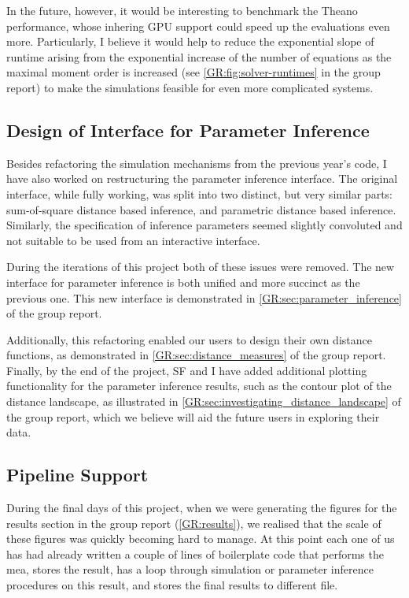 In the future, however, it would be interesting to benchmark the Theano performance, whose inhering GPU support could speed up the evaluations even more.
Particularly, I believe it would help to reduce the exponential slope of runtime arising from the exponential increase of the number of equations as the maximal moment order is increased (see \autoref{GR:fig:solver-runtimes} in the group report) to make the simulations feasible for even more complicated systems.

\subsection{Design of Interface for Parameter Inference}

Besides refactoring the simulation mechanisms from the previous year's code, I have also worked on restructuring the parameter inference interface. 
The original interface, while fully working, was split into two distinct, but very similar parts: sum-of-square distance based inference, and parametric distance based inference. Similarly, the specification of inference parameters seemed slightly convoluted and not suitable to be used from an interactive interface. 

During the iterations of this project both of these issues were removed. The new interface for parameter inference is
both unified and more succinct as the previous one. This new interface is demonstrated in \autoref*{GR:sec:parameter_inference} of the group report.

Additionally, this refactoring enabled our users to design their own distance functions, as demonstrated in \autoref*{GR:sec:distance_measures} of the group report.
Finally, by the end of the project, SF and I have added additional plotting functionality for the parameter inference results, such as the contour plot of the distance landscape, as illustrated in 
\autoref*{GR:sec:investigating_distance_landscape} of the group report, which we believe will aid the future users in exploring their data.

\subsection{Pipeline Support}

During the final days of this project, when we were generating the figures for the results section in the group report (\autoref{GR:results}), we realised that the scale of these figures was quickly becoming hard to manage. 
At this point each one of us has had already written a couple of lines of boilerplate code that performs the \acrlong{mea}, stores the result,  has a loop through simulation or parameter inference procedures on this result, and stores the final results to different file.

